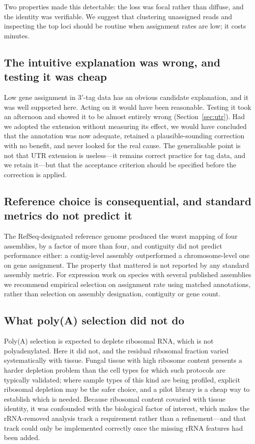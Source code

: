 Two properties made this detectable: the loss was focal rather than diffuse, and the identity
was verifiable. We suggest that clustering unassigned reads and inspecting the top loci should
be routine when assignment rates are low; it costs minutes.

\subsection{The intuitive explanation was wrong, and testing it was cheap}

Low gene assignment in 3$'$-tag data has an obvious candidate explanation, and it was well
supported here. Acting on it would have been reasonable. Testing it took an afternoon and
showed it to be almost entirely wrong (Section~\ref{sec:utr}). Had we adopted the extension
without measuring its effect, we would have concluded that the annotation was now adequate,
retained a plausible-sounding correction with no benefit, and never looked for the real cause.
The generalisable point is not that UTR extension is useless---it remains correct practice for
tag data, and we retain it---but that the acceptance criterion should be specified before the
correction is applied.

\subsection{Reference choice is consequential, and standard metrics do not predict it}

The RefSeq-designated reference genome produced the worst mapping of four assemblies, by a
factor of more than four, and contiguity did not predict performance either: a contig-level
assembly outperformed a chromosome-level one on gene assignment. The property that mattered is
not reported by any standard assembly metric. For expression work on species with several
published assemblies we recommend empirical selection on assignment rate using matched
annotations, rather than selection on assembly designation, contiguity or gene count.

\subsection{What poly(A) selection did not do}

Poly(A) selection is expected to deplete ribosomal RNA, which is not polyadenylated. Here it
did not, and the residual ribosomal fraction varied systematically with tissue. Fungal tissue
with high ribosome content presents a harder depletion problem than the cell types for which
such protocols are typically validated; where sample types of this kind are being profiled,
explicit ribosomal depletion may be the safer choice, and a pilot library is a cheap way to
establish which is needed. Because ribosomal content covaried with tissue identity, it was
confounded with the biological factor of interest, which makes the rRNA-removed analysis track
a requirement rather than a refinement---and that track could only be implemented correctly
once the missing rRNA features had been added.

